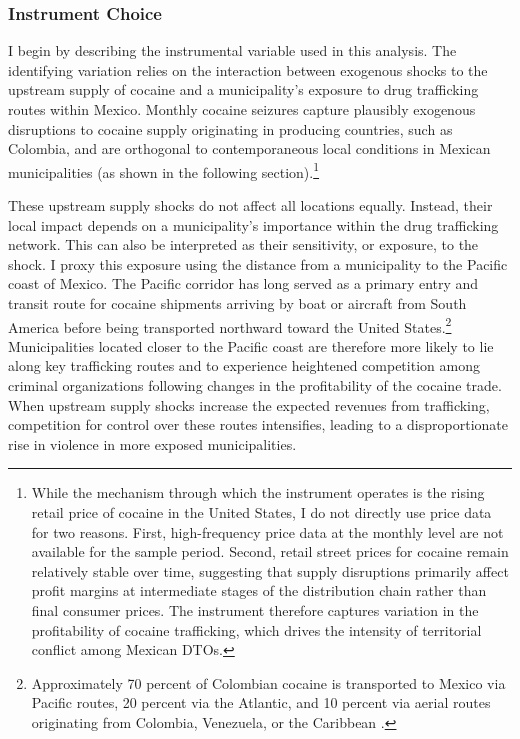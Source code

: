 \documentclass[12pt,letter,english,intoc,bibliography=totoc,index=totoc,BCOR10mm,captions=tableheading,nottitlepage,fleqn]{article}
\theoremstyle{break}
\begin{document}
\subsubsection*{Instrument Choice}
I begin by describing the instrumental variable used in this analysis. The identifying variation relies on the interaction between exogenous shocks to the upstream supply of cocaine and a municipality's exposure to drug trafficking routes within Mexico. Monthly cocaine seizures capture plausibly exogenous disruptions to cocaine supply originating in producing countries, such as Colombia, and are orthogonal to contemporaneous local conditions in Mexican municipalities (as shown in the following section).\footnote{While the mechanism through which the instrument operates is the rising retail price of cocaine in the United States, I do not directly use price data for two reasons. First, high-frequency price data at the monthly level are not available for the sample period. Second, retail street prices for cocaine remain relatively stable over time, suggesting that supply disruptions primarily affect profit margins at intermediate stages of the distribution chain rather than final consumer prices. The instrument therefore captures variation in the profitability of cocaine trafficking, which drives the intensity of territorial conflict among Mexican DTOs.}

These upstream supply shocks do not affect all locations equally. Instead, their local impact depends on a municipality's importance within the drug trafficking network. This can also be interpreted as their sensitivity, or exposure, to the shock. I proxy this exposure using the distance from a municipality to the Pacific coast of Mexico. The Pacific corridor has long served as a primary entry and transit route for cocaine shipments arriving by boat or aircraft from South America before being transported northward toward the United States.\footnote{Approximately 70 percent of Colombian cocaine is transported to Mexico via Pacific routes, 20 percent via the Atlantic, and 10 percent via aerial routes originating from Colombia, Venezuela, or the Caribbean \citet{unodc2010}.} Municipalities located closer to the Pacific coast are therefore more likely to lie along key trafficking routes and to experience heightened competition among criminal organizations following changes in the profitability of the cocaine trade. When upstream supply shocks increase the expected revenues from trafficking, competition for control over these routes intensifies, leading to a disproportionate rise in violence in more exposed municipalities.
\end{document}
